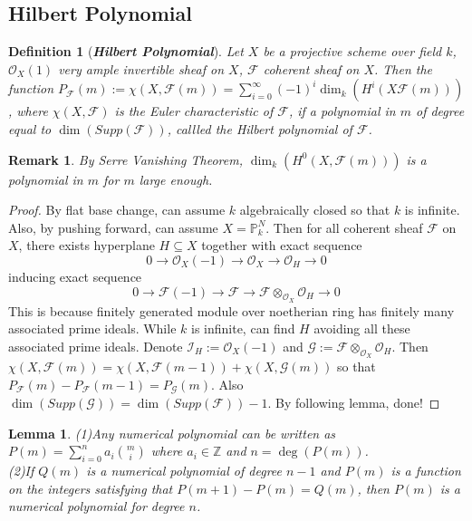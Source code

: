 \documentclass{ctexart}
\newtheorem{definition}{Definition}[section]
\newtheorem{remark}{Remark}[section]
\newtheorem{lemma}{Lemma}[section]
\begin{document}
\subsection{Hilbert Polynomial}
\begin{definition}[\textbf{\emph{Hilbert Polynomial}}]
    Let $X$ be a projective scheme over field $k$, $\mathcal{O}_{X}(1)$ very ample invertible sheaf on $X$, $\mathcal{F}$ coherent sheaf on $X$.
    Then the function $P_{\mathcal{F}}(m) := \chi(X, \mathcal{F}(m)) = \sum_{i = 0}^{\infty} (-1)^{i}\dim_{k}(H^{i}(X \mathcal{F}(m)))$,
    where $\chi(X, \mathcal{F})$ is the Euler characteristic of $\mathcal{F}$,
    if a polynomial in $m$ of degree equal to $\dim(Supp(\mathcal{F}))$, callled the Hilbert polynomial of $\mathcal{F}$.
\end{definition}
\begin{remark}
    By Serre Vanishing Theorem, $\dim_{k}(H^{0}(X, \mathcal{F}(m)))$ is a polynomial in $m$ for $m$ large enough.
\end{remark}
\begin{proof}
    By flat base change, can assume $k$ algebraically closed so that $k$ is infinite.
    Also, by pushing forward, can assume $X = \mathbb{P}_{k}^{N}$.
    Then for all coherent sheaf $\mathcal{F}$ on $X$, there exists hyperplane $H \subseteq X$ together with exact sequence
    \begin{equation*}
        0 \longrightarrow \mathcal{O}_{X}(-1) \longrightarrow \mathcal{O}_{X} \longrightarrow \mathcal{O}_{H} \longrightarrow 0
    \end{equation*}
    inducing exact sequence
    \begin{equation*}
        0 \longrightarrow \mathcal{F}(-1) \longrightarrow \mathcal{F} \longrightarrow \mathcal{F} \otimes_{\mathcal{O}_{X}} \mathcal{O}_{H} \longrightarrow 0
    \end{equation*}
    This is because finitely generated module over noetherian ring has finitely many associated prime ideals.
    While $k$ is infinite, can find $H$ avoiding all these associated prime ideals.
    Denote $\mathcal{I}_{H} := \mathcal{O}_{X}(-1)$ and $\mathcal{G} := \mathcal{F} \otimes_{\mathcal{O}_{X}} \mathcal{O}_{H}$.
    Then $\chi(X, \mathcal{F}(m)) = \chi(X, \mathcal{F}(m - 1)) + \chi(X, \mathcal{G}(m))$ so that $P_{\mathcal{F}}(m) - P_{\mathcal{F}}(m - 1) = P_{\mathcal{G}}(m)$.
    Also $\dim(Supp(\mathcal{G})) = \dim(Supp(\mathcal{F})) - 1$.
    By following lemma, done!
\end{proof}
\begin{lemma}
    (1)Any numerical polynomial can be written as $P(m) = \sum_{i = 0}^{n} a_{i}\binom{m}{i}$ where $a_{i}\in \mathbb{Z}$ and $n = \deg(P(m))$. \\
    (2)If $Q(m)$ is a numerical polynomial of degree $n - 1$ and $P(m)$ is a function on the integers satisfying that $P(m + 1) - P(m) = Q(m)$,
    then $P(m)$ is a numerical polynomial for degree $n$.
    \label{Lemma 12.1}
\end{lemma}
\end{document}
